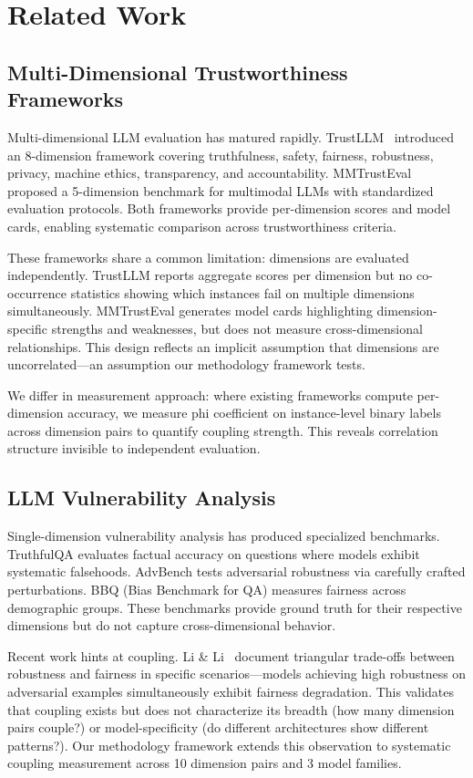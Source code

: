 \section{Related Work}

\subsection{Multi-Dimensional Trustworthiness Frameworks}

Multi-dimensional LLM evaluation has matured rapidly. TrustLLM~\cite{sun2024trustllm} introduced an 8-dimension framework covering truthfulness, safety, fairness, robustness, privacy, machine ethics, transparency, and accountability. MMTrustEval~\cite{li2024mmtrusteval} proposed a 5-dimension benchmark for multimodal LLMs with standardized evaluation protocols. Both frameworks provide per-dimension scores and model cards, enabling systematic comparison across trustworthiness criteria.

These frameworks share a common limitation: dimensions are evaluated independently. TrustLLM reports aggregate scores per dimension but no co-occurrence statistics showing which instances fail on multiple dimensions simultaneously. MMTrustEval generates model cards highlighting dimension-specific strengths and weaknesses, but does not measure cross-dimensional relationships. This design reflects an implicit assumption that dimensions are uncorrelated---an assumption our methodology framework tests.

We differ in measurement approach: where existing frameworks compute per-dimension accuracy, we measure phi coefficient on instance-level binary labels across dimension pairs to quantify coupling strength. This reveals correlation structure invisible to independent evaluation.

\subsection{LLM Vulnerability Analysis}

Single-dimension vulnerability analysis has produced specialized benchmarks. TruthfulQA evaluates factual accuracy on questions where models exhibit systematic falsehoods. AdvBench tests adversarial robustness via carefully crafted perturbations. BBQ (Bias Benchmark for QA) measures fairness across demographic groups. These benchmarks provide ground truth for their respective dimensions but do not capture cross-dimensional behavior.

Recent work hints at coupling. Li \& Li~\cite{li2024triangular} document triangular trade-offs between robustness and fairness in specific scenarios---models achieving high robustness on adversarial examples simultaneously exhibit fairness degradation. This validates that coupling exists but does not characterize its breadth (how many dimension pairs couple?) or model-specificity (do different architectures show different patterns?). Our methodology framework extends this observation to systematic coupling measurement across 10 dimension pairs and 3 model families.

